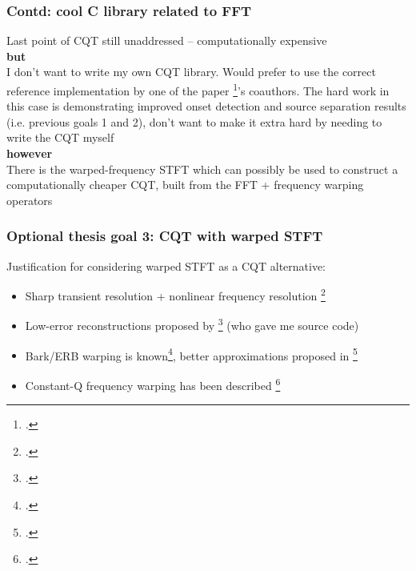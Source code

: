 \documentclass[usenames,dvipsnames]{beamer}
\begin{document}
\begin{frame}
	\frametitle{Contd: cool C library related to FFT}
	Last point of CQT still unaddressed -- computationally expensive\\
	\vspace{1em}
	\textbf{but}\\
	I don't want to write my own CQT library. Would prefer to use the correct reference implementation by one of the paper \footcite{invertiblecqt}'s coauthors. The hard work in this case is demonstrating improved onset detection and source separation results (i.e. previous goals 1 and 2), don't want to make it extra hard by needing to write the CQT myself\\
	\vspace{1em}
	\textbf{however}\\
	There is the warped-frequency STFT which can possibly be used to construct a computationally cheaper CQT, built from the FFT + frequency warping operators
\end{frame}

\begin{frame}
	\frametitle{Optional thesis goal 3: CQT with warped STFT}
	Justification for considering warped STFT as a CQT alternative:
	\begin{itemize}
		\item
			Sharp transient resolution + nonlinear frequency resolution \footcite{warpwabnik}
		\item
			Low-error reconstructions proposed by \footcite{makur2008} (who gave me source code)
		\item
			Bark/ERB warping is known\footcite{barkerb}, better approximations proposed in \footcite{betterwarp}
		\item
			Constant-Q frequency warping has been described \footcite{cqwarp}
	\end{itemize}
\end{frame}
\end{document}
